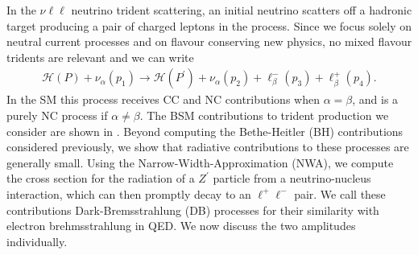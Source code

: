 In the $\nu \ell \ell$ neutrino trident scattering, an initial neutrino scatters off a hadronic target producing a pair of charged leptons in the process. Since we focus solely on neutral current processes and on flavour conserving new physics, no mixed flavour tridents are relevant and we can write 
%
\begin{align*} 
\mathcal{H} (P) + \nu_\alpha (p_1) \to \mathcal{H} (P^\prime) + \nu_\alpha (p_2)  + \ell^-_\beta (p_3) + \ell^+_\beta (p_4). 
\end{align*}
%
In the SM this process receives CC and NC contributions when $\alpha = \beta$, and is a purely NC process if $\alpha \neq \beta$. The BSM contributions to trident production we consider are shown in . Beyond computing the Bethe-Heitler (BH) contributions considered previously, we show that radiative contributions to these processes are generally small. Using the Narrow-Width-Approximation (NWA), we compute the cross section for the radiation of a $Z^\prime$ particle from a neutrino-nucleus interaction, which can then promptly decay to an $\ell^+\ell^-$ pair. We call these contributions Dark-Bremsstrahlung (DB) processes for their similarity with electron brehmsstrahlung in QED. We now discuss the two amplitudes individually.

